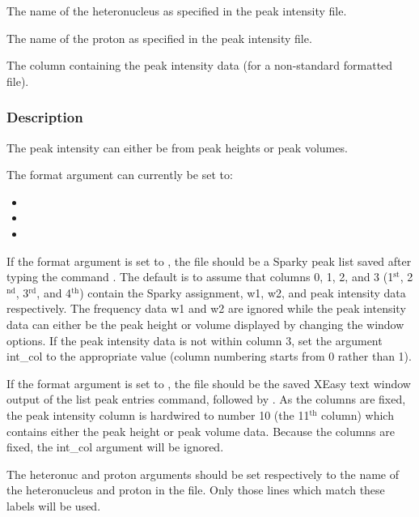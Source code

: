    The name of the heteronucleus as specified in the peak intensity file.   

   The name of the proton as specified in the peak intensity file.   

   The column containing the peak intensity data (for a non-standard formatted file).  

  

  
 \subsubsection{Description} 

 The peak intensity can either be from peak heights or peak volumes. 
  

 The format argument can currently be set to: 
  

 \begin{itemize} 
 \item[]   
 \item[]   
 \item[]  
 \end{itemize} 
  

 If the format argument is set to , the file should be a Sparky peak list saved after typing the command .  The default is to assume that columns 0, 1, 2, and 3 (1$^\mathrm{st}$, 2$^\mathrm{nd}$, 3$^\mathrm{rd}$, and 4$^\mathrm{th}$) contain the Sparky assignment, w1, w2, and peak intensity data respectively. The frequency data w1 and w2 are ignored while the peak intensity data can either be the peak height or volume displayed by changing the window options.  If the peak intensity data is not within column 3, set the argument int\_col to the appropriate value (column numbering starts from 0 rather than 1). 
  

 If the format argument is set to , the file should be the saved XEasy text window output of the list peak entries command,  followed by .  As the columns are fixed, the peak intensity column is hardwired to number 10 (the 11$^\mathrm{th}$ column) which contains either the peak height or peak volume data.  Because the columns are fixed, the int\_col argument will be ignored. 
  

 The heteronuc and proton arguments should be set respectively to the name of the heteronucleus and proton in the file.  Only those lines which match these labels will be used. 
  

